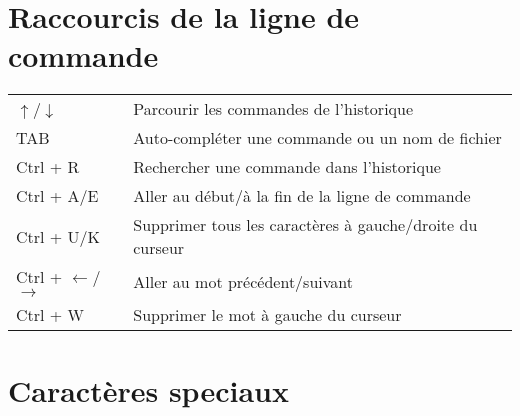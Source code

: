 \documentclass [a4paper]{article}
\begin{document}
\section*{Raccourcis de la ligne de commande}

\noindent
\begin{tabular}{ ll }
\hline
{$\uparrow$/$\downarrow$}           & Parcourir les commandes de l'historique \\
TAB                                 & Auto-compléter une commande ou un nom de fichier \\
{Ctrl + R}                          & Rechercher une commande dans l'historique \\
{Ctrl + A/E}                        & Aller au début/à la fin de la ligne de commande \\
{Ctrl + U/K}                        & Supprimer tous les caractères à gauche/droite du curseur \\
{Ctrl + $\leftarrow$/$\rightarrow$} & Aller au mot précédent/suivant \\
{Ctrl + W}                          & Supprimer le mot à gauche du curseur \\
\hline
\end{tabular}

\section*{Caractères speciaux}
\end{document}
